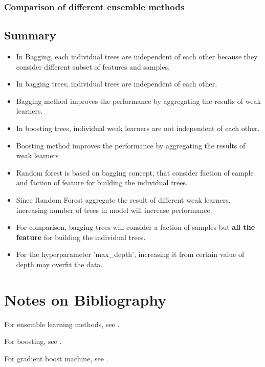 \begin{refsection}
\begin{remark}
	
\end{remark}


\subsubsection{Comparison of different ensemble methods}


\subsection{Summary}

\begin{itemize}
	\item  In Bagging, each individual trees are independent of each other because they consider different subset of features and samples.
	\item In bagging trees, individual trees are independent of each other.
	\item Bagging method improves the performance by aggregating the results of weak learners.
\end{itemize}

\begin{itemize}
	\item In boosting trees, individual weak learners are not independent of each other.
	\item Boosting method improves the performance by aggregating the results of weak learners
\end{itemize}


\begin{itemize}
	\item Random forest is based on bagging concept, that consider faction of sample and faction of feature for building the individual trees.
	\item Since Random Forest aggregate the result of different weak learners, increasing number of trees in model will increase performance.  
	\item For comparison, bagging trees will consider a faction of samples but \textbf{all the feature} for building the individual trees.
\end{itemize}

\begin{itemize}
	\item For the hyperparameter 'max\_depth', increasing it from  certain value of depth may overfit the data.
\end{itemize}

\section{Notes on Bibliography}
For ensemble learning methods, see \cite{seni2010ensemble}.

For boosting, see \cite{schapire2012boosting}.

For gradient boost machine, see \cite{friedman2001greedy}.

\printbibliography
\end{refsection}




